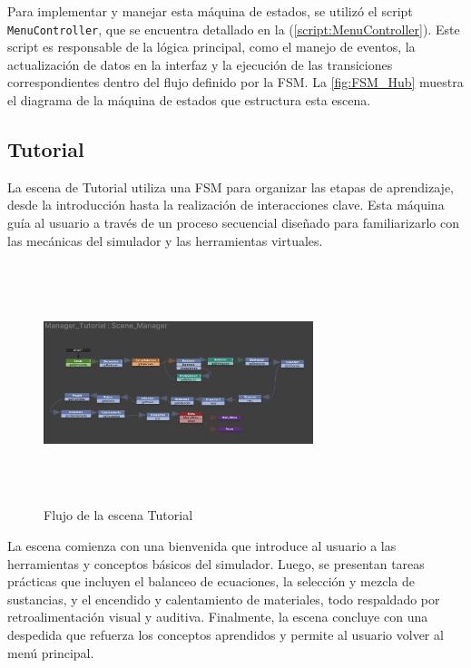 Para implementar y manejar esta máquina de estados, se utilizó el script \texttt{MenuController}, que se encuentra detallado en la (\autoref{script:MenuController}). Este script es responsable de la lógica principal, como el manejo de eventos, la actualización de datos en la interfaz y la ejecución de las transiciones correspondientes dentro del flujo definido por la FSM.
La \autoref{fig:FSM_Hub} muestra el diagrama de la máquina de estados que estructura esta escena.

\subsection{Tutorial}
La escena de Tutorial utiliza una FSM para organizar las etapas de aprendizaje, desde la introducción hasta la realización de interacciones clave. Esta máquina guía al usuario a través de un proceso secuencial diseñado para familiarizarlo con las mecánicas del simulador y las herramientas virtuales.
\begin{figure}[thbp]
    \centering
    \includegraphics[width=0.7\textwidth, height = 7cm]{img/chapter05/Tutorial.png}
    \caption{Flujo de la escena Tutorial}
    \label{fig:FSM_Tutorial}
\end{figure}

La escena comienza con una bienvenida que introduce al usuario a las herramientas y conceptos básicos del simulador. Luego, se presentan tareas prácticas que incluyen el balanceo de ecuaciones, la selección y mezcla de sustancias, y el encendido y calentamiento de materiales, todo respaldado por retroalimentación visual y auditiva. Finalmente, la escena concluye con una despedida que refuerza los conceptos aprendidos y permite al usuario volver al menú principal.
\newpage
